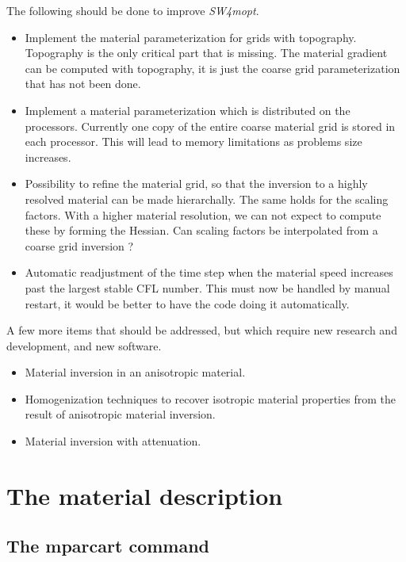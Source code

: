 \documentclass[12pt]{report}
\begin{document}
The following should be done to improve \emph{SW4mopt}.
\begin{itemize}
\item Implement the material parameterization for grids with topography. Topography is the only critical
      part that is missing. The material gradient can be computed with topography, it is just the
      coarse grid parameterization that has not been done.
\item Implement a material parameterization which is distributed on the processors. Currently one copy of
      the entire coarse material grid is stored in each processor. This will lead to memory limitations
      as problems size increases. 
\item Possibility to refine the material grid, so that the inversion to a highly resolved material can 
      be made hierarchally. The same
      holds for the scaling factors. With a higher material resolution, we can not expect to compute these
      by forming the Hessian. Can scaling factors be interpolated from a coarse grid inversion ?
\item Automatic readjustment of the time step when the material speed increases past the 
      largest stable CFL number. This must now be handled by manual restart, it would be better to have
      the code doing it automatically.
\end{itemize}
\par
A few more items that should be addressed, but which require new research and development,
and new software.
\begin{itemize}
\item Material inversion in an anisotropic material.
\item Homogenization techniques to recover isotropic material properties from the result of 
      anisotropic material inversion.
\item Material inversion with attenuation.
\end{itemize}





\chapter{The material description}\label{sec:matdesc}



\section{The mparcart command}\label{sec:mparcartdesc}
\end{document}
